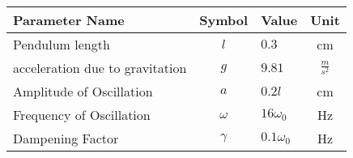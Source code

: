 \begin{tabular}{lclc}
\hline
 Parameter Name                  &  Symbol  & Value            &      Unit       \\
\hline
 Pendulum length                 &   $l$    & $0.3$            &       cm        \\
 acceleration due to gravitation &   $g$    & $9.81$           & $\frac{m}{s^2}$ \\
 Amplitude of Oscillation        &   $a$    & $0.2 l$          &       cm        \\
 Frequency of Oscillation        & $\omega$ & $16 \omega_{0}$  &       Hz        \\
 Dampening Factor                & $\gamma$ & $0.1 \omega_{0}$ &       Hz        \\
\hline
\end{tabular}